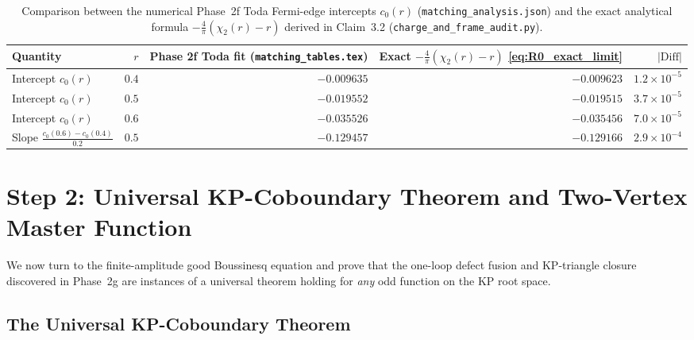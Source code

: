 \documentclass[11pt,a4paper]{article}
\begin{document}
\begin{table}[ht]
\centering
\small
\begin{tabular}{@{}lrrrr@{}}
\toprule
Quantity & $r$ & Phase 2f Toda fit (\texttt{matching\_tables.tex}) & Exact $-\frac{4}{\pi}(\chi_2(r)-r)$ \eqref{eq:R0_exact_limit} & $|\text{Diff}|$ \\
\midrule
Intercept $c_0(r)$ & $0.4$ & $-0.009635$ & $-0.009623$ & $1.2\times 10^{-5}$ \\
Intercept $c_0(r)$ & $0.5$ & $-0.019552$ & $-0.019515$ & $3.7\times 10^{-5}$ \\
Intercept $c_0(r)$ & $0.6$ & $-0.035526$ & $-0.035456$ & $7.0\times 10^{-5}$ \\
\addlinespace
Slope $\frac{c_0(0.6)-c_0(0.4)}{0.2}$ & $0.5$ & $-0.129457$ & $-0.129166$ & $2.9\times 10^{-4}$ \\
\bottomrule
\end{tabular}
\caption{Comparison between the numerical Phase~2f Toda Fermi-edge intercepts
$c_0(r)$ (\texttt{matching\_analysis.json}) and the exact analytical formula
$-\frac{4}{\pi}(\chi_2(r)-r)$ derived in Claim~3.2 (\texttt{charge\_and\_frame\_audit.py}).}
\label{tab:toda_comparison}
\end{table}

\section{Step 2: Universal KP-Coboundary Theorem and Two-Vertex Master Function}
\label{sec:master}

We now turn to the finite-amplitude good Boussinesq equation and prove that the
one-loop defect fusion and KP-triangle closure discovered in Phase~2g are
instances of a universal theorem holding for \emph{any} odd function on the KP
root space.

\subsection{The Universal KP-Coboundary Theorem}
\end{document}
